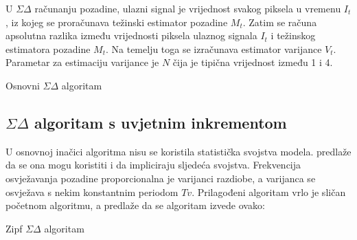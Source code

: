 \documentclass[a4paper,twocolumn]{article}
\providecommand{\abs}[1]{\lvert#1\rvert}
\begin{document}
U \(\Sigma\Delta\) računanju pozadine, ulazni signal je vrijednost svakog
piksela u vremenu \(I_t\), iz kojeg se proračunava težinski estimator pozadine
\(M_t\). Zatim se računa apsolutna razlika između vrijednosti piksela ulaznog
signala \(I_t\) i težinskog estimatora pozadine \(M_t\). Na temelju toga se izračunava
estimator varijance \(V_t\). Parametar za estimaciju varijance
je \(N\) čija je tipična vrijednost između 1 i 4.


\makeatletter
\def\BState{\State\hskip-\ALG@thistlm}
\makeatother

\begin{algorithm}
\caption{Osnovni \(\Sigma\Delta\) algoritam}\label{euclid}
\begin{algorithmic}[1]
\Else
\EndIf
\EndFor
{}
  \State{\(O_{t}(x) = \abs{M_{t}(x) - I_t(x)}\)}
\EndFor
{}
\Else
\EndIf
\EndFor
{}
\Else
\EndIf
\EndFor
\end{algorithmic}
\end{algorithm}

\subsection{\(\Sigma\Delta\) algoritam s uvjetnim inkrementom}
U osnovnoj inačici algoritma nisu se koristila statistička svojstva modela.
\cite{sigma} predlaže da se ona mogu koristiti i da impliciraju sljedeća
svojstva. Frekvencija osvježavanja pozadine proporcionalna je varijanci
razdiobe, a varijanca se osvježava s nekim konstantnim periodom \(Tv\).
Prilagođeni algoritam vrlo je sličan početnom algoritmu, a \cite{zipf} predlaže
da se algoritam izvede ovako:
\begin{algorithm}
\caption{Zipf \(\Sigma\Delta\) algoritam}\label{zipf}
\begin{algorithmic}[1]
\EndIf
\State{\(O_{t}(x) = \abs{M_{t}(x) - I_t(x)}\)}
\EndIf
\EndFor
\end{algorithmic}
\end{algorithm}
\end{document}
